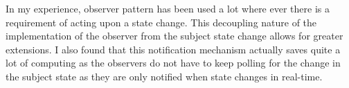 In my experience, observer pattern has been used a lot where ever there is a requirement of acting upon a state change. This decoupling nature of the implementation of the observer from the subject state change allows for greater extensions. I also found that this notification mechanism actually saves quite a lot of computing as the observers do not have to keep polling for the change in the subject state as they are only notified when state changes in real-time. 
